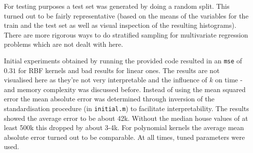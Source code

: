 \par For testing purposes a test set was generated by doing a random split. This turned out to be fairly representative (based on the means of the variables for the train and the test set as well as visual inspection of the resulting histograms). There are more rigorous ways to do stratified sampling for multivariate regression problems which are not dealt with here.

\endgroup

\par Initial experiments obtained by running the provided code resulted in an \texttt{mse} of $0.31$ for RBF kernels and bad results for linear ones. The results are not visualised here as they're not very interpretable and the influence of $k$ on time - and memory complexity was discussed before. Instead of using the mean squared error the mean absolute error was determined through inversion of the standardisation procedure (in \texttt{initial.m})  to facilitate interpretability. The results showed the average error to be about 42k. Without the median house values of at least 500k this dropped by about 3-4k. For polynomial kernels the average mean absolute error turned out to be comparable. At all times, tuned parameters were used.

